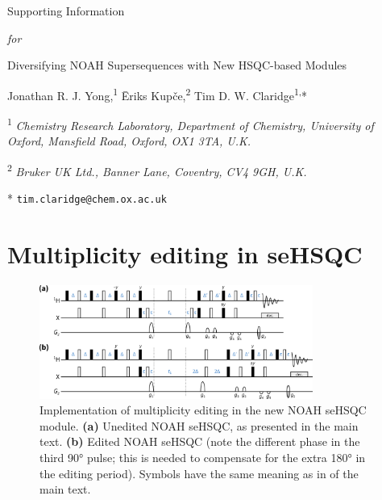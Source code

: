 \newcommand{\sectionbreak}{\clearpage}
\renewcommand\thefigure{S\arabic{figure}}
\renewcommand\thetable{S\arabic{table}}
\setcounter{page}{1}
\setcounter{figure}{0}
\setcounter{table}{0}
\onehalfspacing

\hspace{0pt}
\vfill
\begin{center}
    \huge
    Supporting Information

    \textit{for}

    Diversifying NOAH Supersequences with New HSQC-based Modules

    \vspace{1cm}

    \Large Jonathan R. J. Yong,\textsuperscript{1} {\=E}riks Kup{\v{c}}e,\textsuperscript{2} Tim D. W. Claridge\textsuperscript{1,}*

    \vspace{1cm}

    \large \textsuperscript{1} \textit{Chemistry Research Laboratory, Department of Chemistry, University of Oxford, Mansfield Road, Oxford, OX1 3TA, U.K.}

    \textsuperscript{2} \textit{Bruker UK Ltd., Banner Lane, Coventry, CV4 9GH, U.K.}

    * \texttt{tim.claridge@chem.ox.ac.uk}
\end{center}
\thispagestyle{empty}
\vfill
\hspace{0pt}
\newpage

\tableofcontents

\newpage

\section{Multiplicity editing in seHSQC}

\begin{figure}
    \centering
    \includegraphics[width=0.8\textwidth]{./figures/mult_edit.png}
    \caption{
        Implementation of multiplicity editing in the new NOAH seHSQC module.
        \textbf{(a)} Unedited NOAH seHSQC, as presented in the main text.
        \textbf{(b)} Edited NOAH seHSQC (note the different phase in the third \proton{} \ang{90} pulse; this is needed to compensate for the extra \ang{180} in the editing period).
        Symbols have the same meaning as in  of the main text.
    }
    \label{fig:edited_sehsqc_pprog}
\end{figure}

